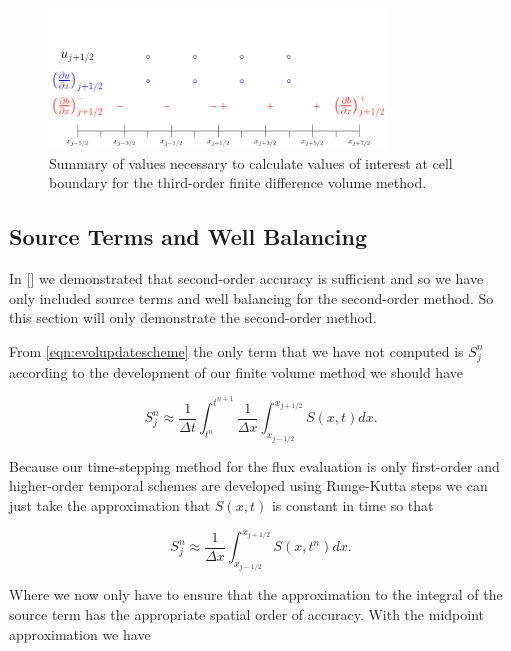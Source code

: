 
\begin{figure}
	\centering
	\includegraphics[width=0.8\textwidth]{./chp3/figures/3rdorderecon.pdf}
	\caption{Summary of values necessary to calculate values of interest at cell boundary for the third-order finite difference volume method.}
	\label{fig:3rdorderrecon}
\end{figure}

\subsection{Source Terms and Well Balancing}
In [] we demonstrated that second-order accuracy is sufficient and so we have only included source terms and well balancing for the second-order method. So this section will only demonstrate the second-order method.

From \eqref{eqn:evolupdatescheme} the only term that we have not computed is $S^n_j$ according to the development of our finite volume method we should have

\begin{equation*}
S^n_j \approx \frac{1}{\Delta t} \int^{t^{n+1}}_{t^n}  \frac{1}{\Delta x}\int^{x_{j+1/2}}_{x_{j-1/2}} S (x,t) dx.
\end{equation*}

Because our time-stepping method for the flux evaluation is only first-order and higher-order temporal schemes are developed using Runge-Kutta steps we can just take the approximation that $S(x,t)$ is constant in time so that

\begin{equation*}
S^n_j \approx \frac{1}{\Delta x}\int^{x_{j+1/2}}_{x_{j-1/2}} S (x,t^n) dx.
\end{equation*}

Where we now only have to ensure that the approximation to the integral of the source term has the appropriate spatial order of accuracy. With the midpoint approximation we have


